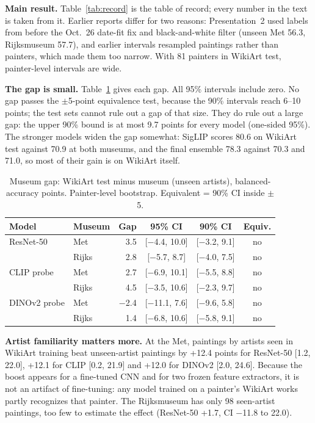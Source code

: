 \documentclass[conference]{IEEEtran}
\begin{document}
\textbf{Main result.} Table~\ref{tab:record} is the table of record; every number in the text is taken from it. Earlier reports differ for two reasons: Presentation~2 used labels from before the Oct.~26 date-fit fix and black-and-white filter (unseen Met 56.3, Rijksmuseum 57.7), and earlier intervals resampled paintings rather than painters, which made them too narrow. With 81 painters in WikiArt test, painter-level intervals are wide.

\textbf{The gap is small.} Table~\ref{tab:gaps} gives each gap. All 95\% intervals include zero. No gap passes the $\pm$5-point equivalence test, because the 90\% intervals reach 6--10 points; the test sets cannot rule out a gap of that size. They do rule out a large gap: the upper 90\% bound is at most 9.7 points for every model (one-sided 95\%). The stronger models widen the gap somewhat: SigLIP scores 80.6 on WikiArt test against 70.9 at both museums, and the final ensemble 78.3 against 70.3 and 71.0, so most of their gain is on WikiArt itself.

\begin{table}[t]
\centering
\caption{Museum gap: WikiArt test minus museum (unseen artists), balanced-accuracy points. Painter-level bootstrap. Equivalent = 90\% CI inside $\pm$5.}
\label{tab:gaps}
\setlength{\tabcolsep}{4pt}
\begin{tabular}{llrccc}
\toprule
Model & Museum & Gap & 95\% CI & 90\% CI & Equiv. \\
\midrule
ResNet-50 & Met & 3.5 & [$-$4.4, 10.0] & [$-$3.2, 9.1] & no \\
 & Rijks & 2.8 & [$-$5.7, 8.7] & [$-$4.0, 7.5] & no \\
CLIP probe & Met & 2.7 & [$-$6.9, 10.1] & [$-$5.5, 8.8] & no \\
 & Rijks & 4.5 & [$-$3.5, 10.6] & [$-$2.3, 9.7] & no \\
DINOv2 probe & Met & $-$2.4 & [$-$11.1, 7.6] & [$-$9.6, 5.8] & no \\
 & Rijks & 1.4 & [$-$6.8, 10.6] & [$-$5.8, 9.1] & no \\
\bottomrule
\end{tabular}
\end{table}

\textbf{Artist familiarity matters more.} At the Met, paintings by artists seen in WikiArt training beat unseen-artist paintings by +12.4 points for ResNet-50 [1.2, 22.0], +12.1 for CLIP [0.2, 21.9] and +12.0 for DINOv2 [2.0, 24.6]. Because the boost appears for a fine-tuned CNN and for two frozen feature extractors, it is not an artifact of fine-tuning: any model trained on a painter's WikiArt works partly recognizes that painter. The Rijksmuseum has only 98 seen-artist paintings, too few to estimate the effect (ResNet-50 +1.7, CI $-$11.8 to 22.0).
\end{document}
